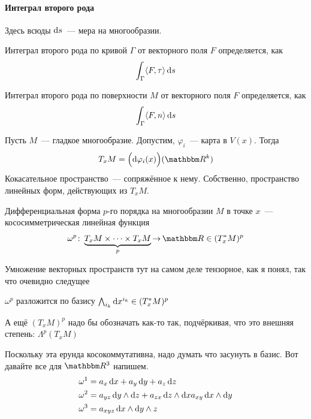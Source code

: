 \documentclass[draft,timbord]{longnotes}
\begin{document}
\paragraph{Интеграл второго рода}
\label{par:dg::secint}

Здесь всюды $\mathrm{d} s$~--- мера на многообразии.
\begin{defn}\label{defn:dg::secint::curv}
  Интеграл второго рода по кривой $\Gamma$  от векторного поля $F$ определяется, как 
  \[
  \int_\Gamma  \langle F ,\tau \rangle \, \mathrm{d} s
  \]
\end{defn}

\begin{defn}\label{defn:dg::secint::surf}
  Интеграл второго рода по поверхности $M$  от векторного поля $F$ определяется, как 
  \[
  \int_\Gamma  \langle F ,n \rangle \, \mathrm{d} s
  \]
\end{defn}

\begin{defn}\label{defn:dg::AAAA::tangentbndl}
  Пусть $M$~--- гладкое многообразие. Допустим, $\varphi_i$~--- карта в $V(x)$.
  Тогда
  \[
    T_x M = \Bigl(\del \varphi_i (x)\Bigr)(\R^k)
  \]
  Кокасательное пространство~--- сопряжённое к нему. Собственно, пространство линейных форм,
  действующих из $T_xM$.
\end{defn}

\begin{defn}\label{defn:dg::secint::difform}
  Дифференциальная форма $p$-го порядка на многообразии $M$ в точке $x$~--- 
  кососимметрическая линейная функция 
  \[
    \omega^p \colon \underbrace{T_x M \times \dotsm \times T_x M}_p  \to \R \in (T^*_x M)^p
  \]
\end{defn}
Умножение векторных пространств тут на самом деле тензорное, как я понял, так что
очевидно следущее
\begin{stat}\label{stat:dg::secint::difformbasis}
  $\omega^p$ разложится по базису $\bigwedge_{i_k} \mathrm{d} x^{i_k} \in (T^*_x M)^p$
\end{stat}
А ещё $(T_xM)^p$ надо бы обозначать как-то так, подчёркивая, что это внешняя степень: 
$\Lambda^p (T_xM)$

\begin{exmp}\label{exmp:dg::secint::difformbasis}
  Поскольку эта ерунда косокоммутативна, надо думать что засунуть в базис.
  Вот давайте все для $\R^3$ напишем.
  \begin{align*}
    \omega^1 &= a_x\,\mathrm{d} x + a_y\,\mathrm{d} y + a_z\,\mathrm{d} z \\
    \omega^2 &= a_{yz}\,\mathrm{d} y\wedge\mathrm{d} z+a_{zx}\,\mathrm{d} z \wedge\mathrm{d} xa_{xy}\,\mathrm{d} x\wedge\mathrm{d} y\\
    \omega^3 &= a_{xyz}\,\mathrm{d} x \wedge\mathrm{d} y\wedge z
  \end{align*}
\end{exmp}
\end{document}
